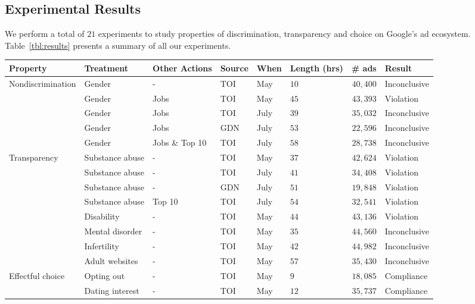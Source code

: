 \documentclass[10pt, onecolumn]{report}
\begin{document}
\subsection{Experimental Results}

We perform a total of
$21$ experiments to study properties of discrimination, transparency and choice
on Google's ad ecosystem. Table~\ref{tbl:results} presents a summary of 
all our experiments. 

\begin{table}
\begin{tabular}{llL{1.5cm}llL{1cm}rl}
\hline
Property & Treatment & Other Actions & Source & When & Length (hrs) & \# ads & Result \\
\hline
Nondiscrimination %
& Gender & - & TOI & May & $10$ & $40,400$ & Inconclusive\\
& Gender & Jobs & TOI & May &  $45$ & $43,393$ & Violation\\
& Gender & Jobs & TOI & July & $39$  & $35,032$ & Inconclusive\\
& Gender & Jobs & GDN & July & $53$ & $22,596$ & Inconclusive\\
& Gender & Jobs \& Top 10 & TOI & July & $58$ & $28,738$ & Inconclusive\\
\hline
Transparency %
& Substance abuse & - & TOI & May & $37$ & $42,624$ & Violation\\
& Substance abuse & - & TOI & July & $41$ & $34,408$  & Violation\\
& Substance abuse & - & GDN & July & $51$ & $19,848$   & Violation\\
& Substance abuse & Top 10 & TOI & July & $54$ & $32,541$   & Violation\\
& Disability & - & TOI & May & $44$ & $43,136$   & Violation\\
& Mental disorder & - & TOI & May & $35$ & $44,560$  & Inconclusive\\
& Infertility & - & TOI & May & $42$ & $44,982$  & Inconclusive\\
& Adult websites & - & TOI & May & $57$ & $35,430$  & Inconclusive\\
\hline
Effectful choice  %
& Opting out & - & TOI & May & $9$ & $18,085$  & Compliance\\
& Dating interest & - & TOI & May & $12$ & $35,737$  &  Compliance\\

\end{tabular}
\end{table}
\end{document}
